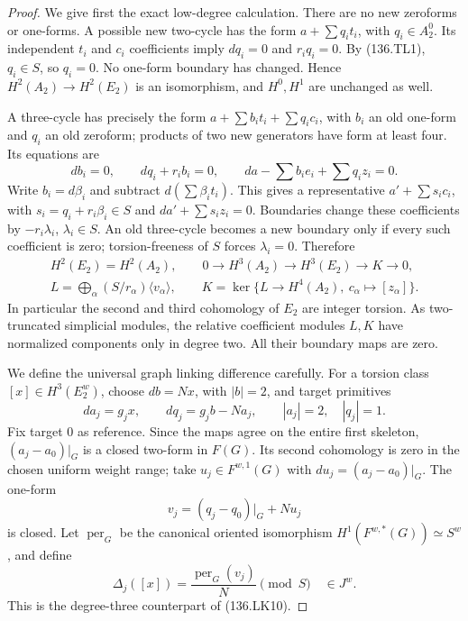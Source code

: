 \begin{proof}
We give first the exact low-degree calculation.  There are no
new zeroforms or one-forms.  A possible new two-cycle has the
form \(a+\sum q_i t_i\), with \(q_i\in A_2^0\).
Its independent \(t_i\) and \(c_i\) coefficients imply
\(dq_i=0\) and \(r_iq_i=0\).  By (136.TL1),
\(q_i\in S\), so \(q_i=0\).  No one-form boundary
has changed.  Hence \(H^2(A_2)\to H^2(E_2)\) is an
isomorphism, and \(H^0,H^1\) are unchanged as well.

A three-cycle has precisely the form
\(a+\sum b_i t_i+\sum q_i c_i\), with \(b_i\) an
old one-form and \(q_i\) an old zeroform; products of two
new generators have form at least four.  Its equations are
\[
 db_i=0,\qquad dq_i+r_i b_i=0,\qquad
                da-\sum b_i e_i+\sum q_i z_i=0.
                                                               \tag{136.TL4}
\]
Write \(b_i=d\beta_i\) and subtract
\(d(\sum\beta_i t_i)\).  This gives a representative
\(a'+\sum s_i c_i\), with \(s_i=q_i+r_i\beta_i\in S\)
and \(da'+\sum s_i z_i=0\).  Boundaries change these
coefficients by \(-r_i\lambda_i\), \(\lambda_i\in S\).
An old three-cycle becomes a new boundary only if every such
coefficient is zero; torsion-freeness of \(S\) forces
\(\lambda_i=0\).  Therefore
\[
 \begin{gathered}
 H^2(E_2)=H^2(A_2),\qquad
 0\longrightarrow H^3(A_2)\longrightarrow H^3(E_2)
                              \longrightarrow K\longrightarrow0,\\
 L=\bigoplus_\alpha(S/r_\alpha)\langle v_\alpha\rangle,
 \qquad K=\ker\{L\longrightarrow H^4(A_2),\ c_\alpha\longmapsto[z_\alpha]\}.
 \end{gathered}                                             \tag{136.TL5}
\]
In particular the second and third cohomology of \(E_2\)
are integer torsion.  As two-truncated simplicial modules,
the relative coefficient modules \(L,K\) have normalized
components only in degree two.  All their boundary maps are zero.

We define the universal graph linking difference carefully.
For a torsion class \([x]\in H^3(E_2^w)\), choose
\(db=Nx\), with \(|b|=2\), and target primitives
\[
 da_j=g_jx,\qquad dq_j=g_jb-Na_j,
                  \qquad |a_j|=2,\quad |q_j|=1.
                                                               \tag{136.TL6}
\]
Fix target \(0\) as reference.  Since the maps agree on
the entire first skeleton, \((a_j-a_0)|_G\) is a closed
two-form in \(F(G)\).  Its second cohomology is zero
in the chosen uniform weight range; take
\(u_j\in F^{w,1}(G)\) with
\(du_j=(a_j-a_0)|_G\).  The one-form
\[
                   v_j=(q_j-q_0)|_G+Nu_j
                                                               \tag{136.TL7}
\]
is closed.  Let \(\operatorname{per}_G\) be the canonical
oriented isomorphism \(H^1(F^{w,*}(G))\simeq S^w\),
and define
\[
             \Delta_j([x])=
                  \frac{\operatorname{per}_G(v_j)}{N}\pmod S
                                     \quad\in J^w.
                                                               \tag{136.TL8}
\]
This is the degree-three counterpart of (136.LK10).


\end{proof}
